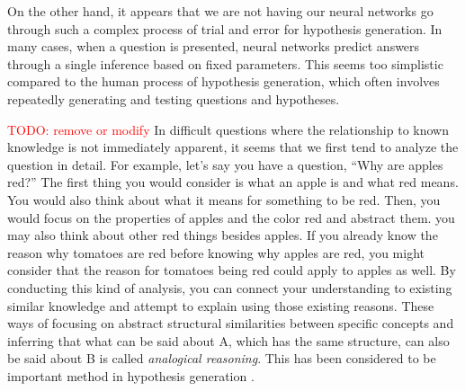 \documentclass{article}
\begin{document}
On the other hand, it appears that we are not having our neural networks go through such a complex process of trial and error for hypothesis generation. In many cases, when a question is presented, neural networks predict answers through a single inference based on fixed parameters. This seems too simplistic compared to the human process of hypothesis generation, which often involves repeatedly generating and testing questions and hypotheses.


\textcolor{red}{TODO: remove or modify}
In difficult questions where the relationship to known knowledge is not immediately apparent, it seems that we first tend to analyze the question in detail. For example, let's say you have a question, ``Why are apples red?'' The first thing you would consider is what an apple is and what red means. You would also think about what it means for something to be red. Then, you would focus on the properties of apples and the color red and abstract them. you may also think about other red things besides apples. If you already know the reason why tomatoes are red before knowing why apples are red, you might consider that the reason for tomatoes being red could apply to apples as well. By conducting this kind of analysis, you can connect your understanding to existing similar knowledge and attempt to explain using those existing reasons. These ways of focusing on abstract structural similarities between specific concepts and inferring that what can be said about A, which has the same structure, can also be said about B is called \textit{analogical reasoning}. This has been considered to be important method in hypothesis generation \cite{thagard_1984}.
\end{document}
